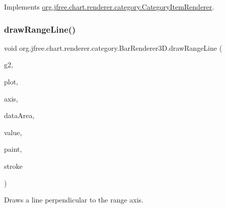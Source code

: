 Implements \mbox{\hyperlink{interfaceorg_1_1jfree_1_1chart_1_1renderer_1_1category_1_1_category_item_renderer_ac0e4384b40cf356acd53c1ca261c5fa8}{org.\+jfree.\+chart.\+renderer.\+category.\+Category\+Item\+Renderer}}.

\mbox{\label{classorg_1_1jfree_1_1chart_1_1renderer_1_1category_1_1_bar_renderer3_d_a1b8f7a30d94b78d788523cb04be8f03c}} 
\subsubsection{\texorpdfstring{draw\+Range\+Line()}{drawRangeLine()}}
{\footnotesize\ttfamily void org.\+jfree.\+chart.\+renderer.\+category.\+Bar\+Renderer3\+D.\+draw\+Range\+Line (\begin{DoxyParamCaption}\item[{Graphics2D}]{g2,  }\item[{\mbox{\hyperlink{classorg_1_1jfree_1_1chart_1_1plot_1_1_category_plot}{Category\+Plot}}}]{plot,  }\item[{\mbox{\hyperlink{classorg_1_1jfree_1_1chart_1_1axis_1_1_value_axis}{Value\+Axis}}}]{axis,  }\item[{Rectangle2D}]{data\+Area,  }\item[{double}]{value,  }\item[{Paint}]{paint,  }\item[{Stroke}]{stroke }\end{DoxyParamCaption})}

Draws a line perpendicular to the range axis.


